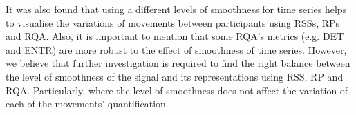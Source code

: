 It was also found that using a different levels of smoothness
for time series helps to visualise the variations of movements 
between participants using RSSs, RPs and RQA. Also, it is important to mention 
that some RQA's metrics (e.g. DET and  ENTR) are more robust 
to the effect of smoothness of time series.
However, we believe that further investigation is required to find the 
right balance between the level of smoothness of the signal
and its representations using RSS, RP and RQA.
Particularly, where the level of smoothness does not affect 
the variation of each of the movements' quantification.
%
% 

